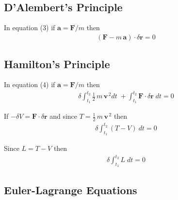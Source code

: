 \documentclass[11pt,fleqn]{article}
\begin{document}
\bigskip \medskip

{\centering\subsection*{D'Alembert's Principle}}

\medskip

\par In equation (3) if $\mathbf{a} = \mathbf{F} / m$ then
\begin{eqnarray*}
(\mathbf{F} - m \, \mathbf{a}) \cdot \delta \mathbf{r} = 0
\end{eqnarray*}

\newpage

{\centering\subsection*{Hamilton's Principle}}

\medskip

\par In equation (4) if $\mathbf{a} = \mathbf{F} / m$ then
\begin{eqnarray*}
\delta \int_{t_1}^{t_2} {\textstyle \frac{1}{2}} \, m \, \mathbf{v}^{\, 2} dt \; + \int_{t_1}^{t_2} \mathbf{F} \cdot \delta \mathbf{r} \; dt = 0
\end{eqnarray*}
\par If $- \delta V = \mathbf{F} \cdot \delta \mathbf{r}$ and since $T = {\textstyle \frac{1}{2}} \, m \, \mathbf{v}^{\, 2}$ then
\begin{eqnarray*}
\delta \int_{t_1}^{t_2} (T - V) \: dt = 0
\end{eqnarray*}
\par Since $L = T - V$ then
\begin{eqnarray*}
\delta \int_{t_1}^{t_2} L \; dt = 0
\end{eqnarray*}

\bigskip

{\centering\subsection*{Euler-Lagrange Equations}}

\bigskip
\end{document}
